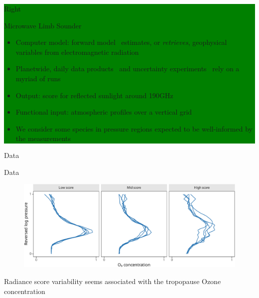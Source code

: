 \documentclass[final]{beamer}
\begin{document}
\begin{frame}[t]
{\begin{minipage}[t][76cm][t]{58cm}
{\begin{minipage}[t][20cm][t]{28cm}
        \end{minipage}
      }
      \colorbox{green}{
        \begin{minipage}[t][20cm][t]{28cm}
          Right
          \begin{block}{Microwave Limb Sounder}
            \begin{itemize}
            \item Computer model: forward
              model~\cite{read2006,schwartz2006,waters2006} estimates, or
              \emph{retrieves}, geophysical variables from electromagnetic radiation
            \item Planetwide, daily data products~\cite{liversey2020} and uncertainty
              experiments~\cite{turmon2019,braverman2021} rely on a myriad of runs
            \item Output: score for reflected sunlight around 190GHz~\cite{johnson2020}
            \item Functional input: atmospheric profiles over a vertical grid
            \item We consider some species in pressure regions expected to be
              well-informed by the measurements~\cite{liversey2020}
            \end{itemize}
          \end{block}
        \end{minipage}
      }
      \vskip1cm
      \colorbox{yellow!33}{
        \begin{minipage}[t][50cm][t]{58cm}
          Data
          \begin{block}{Data}
            \begin{figure}
              \centering
              \includegraphics[width=.85\linewidth]{inc/mls_input_profiles}
            \end{figure}

            \begin{center}
              Radiance score variability seems associated with the tropopause Ozone
              concentration
            \end{center}
          \end{block}


\end{minipage}}
\end{minipage}}
\end{frame}
\end{document}

